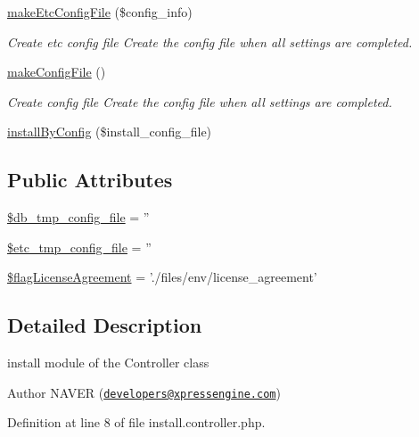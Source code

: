 \begin{DoxyCompactItemize}
\hyperlink{classinstallController_a87b331e263614e15c5366284648f6ee0}{make\+Etc\+Config\+File} (\$config\+\_\+info)
\begin{DoxyCompactList}\small\item\em Create etc config file Create the config file when all settings are completed. \end{DoxyCompactList}\item 
\hyperlink{classinstallController_a1ccad92dd450d67e90a2efdde0f6b78a}{make\+Config\+File} ()
\begin{DoxyCompactList}\small\item\em Create config file Create the config file when all settings are completed. \end{DoxyCompactList}\item 
\hyperlink{classinstallController_a4ec44b3090b73660ba018945c2ffa239}{install\+By\+Config} (\$install\+\_\+config\+\_\+file)
\end{DoxyCompactItemize}
\subsection*{Public Attributes}
\begin{DoxyCompactItemize}
\item 
\hyperlink{classinstallController_a1d32cf378279cb2b7d388b8a7e88c7aa}{\$db\+\_\+tmp\+\_\+config\+\_\+file} = ''
\item 
\hyperlink{classinstallController_a8e090f5c9a9844fbd8b4f0855a52dc43}{\$etc\+\_\+tmp\+\_\+config\+\_\+file} = ''
\item 
\hyperlink{classinstallController_af1f7a5fe91be6a576cdffcc07cba5be8}{\$flag\+License\+Agreement} = './files/env/license\+\_\+agreement'
\end{DoxyCompactItemize}


\subsection{Detailed Description}
install module of the Controller class 

\begin{DoxyAuthor}{Author}
N\+A\+V\+E\+R (\href{mailto:developers@xpressengine.com}{\tt developers@xpressengine.\+com}) 
\end{DoxyAuthor}


Definition at line 8 of file install.\+controller.\+php.



